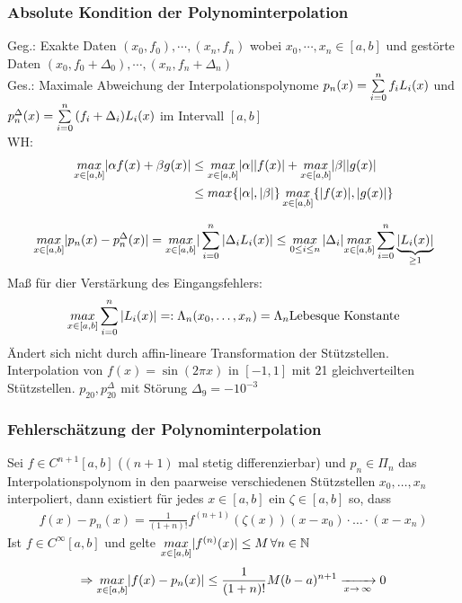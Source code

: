 \subsubsection{Absolute Kondition der Polynominterpolation}
Geg.: Exakte Daten $(x_0, f_0), \cdots, (x_n, f_n)$ wobei $x_0, \cdots, x_n \in [a, b]$ und
gestörte Daten $(x_0, f_0 + \Delta_0), \cdots, (x_n, f_n + \Delta_n)$ \\
Ges.: Maximale Abweichung der Interpolationspolynome $p_n(x) = \sum\limits_{i=0}^{n}{f_i L_i(x)}$ und
$p^{\Delta}_n(x) = \sum\limits_{i=0}^{n}{(f_i + \Delta_i) L_i(x)}$ im Intervall $[a, b]$ \\
WH:
\begin{align*}
  \underset{x \in [a, b]}{max} |\alpha f(x) + \beta g(x)| &\leq
    \underset{x \in [a, b]}{max} |\alpha| |f(x)| + \underset{x \in [a, b]}{max} |\beta| |g(x)| \\
  &\leq max\{|\alpha|, |\beta|\}\, \underset{x \in [a, b]}{max}\{|f(x)|, |g(x)|\}
\end{align*}

\begin{align*}
  \underset{x \in [a, b]}{max} |p_n(x) - p^{\Delta}_n(x)| = \underset{x \in [a, b]}{max} | \sum\limits_{i=0}^{n}{|\Delta_i L_i(x)} | \leq
  \underset{0 \leq i \leq n}{max}\,|\Delta_i| \underset{x \in [a, b]}{max} \sum\limits_{i=0}^{n}{\underbrace{|L_i(x)|}_{\geq 1}}
\end{align*}
Maß für dier Verstärkung des Eingangsfehlers:
\begin{equation*}
  \underset{x \in [a, b]}{max} \sum\limits_{i=0}^{n}{|L_i(x)|} =: \Lambda_n(x_0, \dots, x_n) = \Lambda_n 
  \text{Lebesque Konstante}
\end{equation*}
Ändert sich nicht durch affin-lineare Transformation der Stützstellen.
 Interpolation von $f(x) =\sin(2\pi x)$ in $[-1, 1]$ mit 21
gleichverteilten Stützstellen. $p_{20}, p_{20}^\Delta$ mit Störung $\Delta_9 = -10^{-3}$

\subsubsection{Fehlerschätzung der Polynominterpolation}
Sei $f \in C^{n+1} [a, b]$ ($(n+1)$ mal stetig differenzierbar) und $p_n \in \Pi_n$
das Interpolationspolynom in den paarweise verschiedenen Stützstellen $x_0, \dots, x_n$
interpoliert, dann existiert für jedes $x \in [a, b]$ ein $\zeta \in [a, b]$ so, dass
\begin{align*}
  f(x) - p_n(x) = \frac{1}{(1 + n)!} f^{(n+1)}(\zeta(x))(x - x_0)\cdot \dots \cdot(x - x_n)
\end{align*}
Ist $f \in C^\infty [a, b]$ und gelte $\underset{x \in [a, b]}{max} |f^{(n)}(x)| \leq M \, \forall n \in \mathbb{N}$ \\
\begin{align*}
  \Rightarrow \underset{x \in [a, b]}{max} |f(x) - p_n(x)| \leq 
  \frac{1}{(1 + n)!}M(b - a)^{n + 1} \xrightarrow[x\to\,\infty]{} 0
\end{align*}

